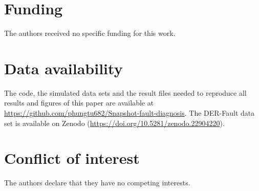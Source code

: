 \documentclass[11pt]{article}
\begin{document}
\section*{Funding}
The authors received no specific funding for this work.

\section*{Data availability}
The code, the simulated data sets and the result files needed to reproduce all results and figures of this paper are available at \url{https://github.com/phungtu682/Snapshot-fault-diagnosis}. The DER-Fault data set is available on Zenodo (\url{https://doi.org/10.5281/zenodo.22904220}).

\section*{Conflict of interest}
The authors declare that they have no competing interests.
\end{document}

